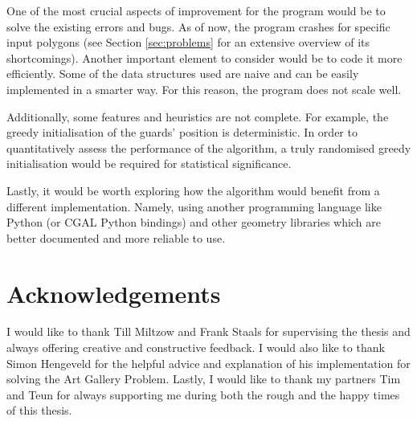 One of the most crucial aspects of improvement for the program would be to solve the existing errors and bugs. As of now, the program crashes for specific input polygons (see Section \ref{sec:problems} for an extensive overview of its shortcomings). Another important element to consider would be to code it more efficiently. Some of the data structures used are naive and can be easily implemented in a smarter way. For this reason, the program does not scale well. 

Additionally, some features and heuristics are not complete. For example, the greedy initialisation of the guards' position is deterministic. In order to quantitatively assess the performance of the algorithm, a truly randomised greedy initialisation would be required for statistical significance.

Lastly, it would be worth exploring how the algorithm would benefit from a different implementation. Namely, using another programming language like Python (or CGAL Python bindings) and other geometry libraries which are better documented and more reliable to use.


\newpage
\thispagestyle{empty}
\section*{Acknowledgements}
I would like to thank Till Miltzow and Frank Staals for supervising the thesis and always offering creative and constructive feedback. I would also like to thank Simon Hengeveld for the helpful advice and explanation of his implementation for solving the Art Gallery Problem.
Lastly, I would like to thank my partners Tim and Teun for always supporting me during both the rough and the happy times of this thesis.